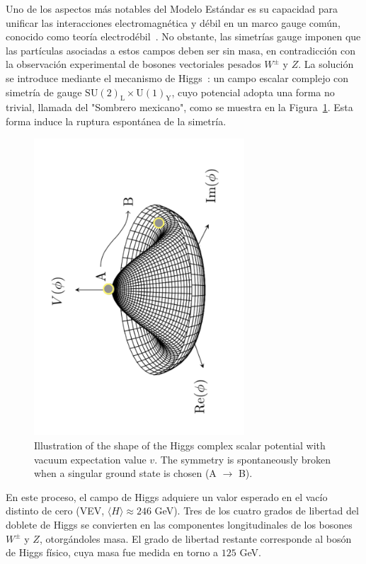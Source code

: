Uno de los aspectos más notables del Modelo Estándar es su capacidad para unificar las interacciones electromagnética y débil en un marco gauge común, conocido como teoría electrodébil~\cite{Glashow,Weinberg,Salam}. No obstante, las simetrías gauge imponen que las partículas asociadas a estos campos deben ser sin masa, en contradicción con la observación experimental de bosones vectoriales pesados \(W^\pm\) y \(Z\). La solución se introduce mediante el mecanismo de Higgs~\cite{Brout,HiggsSpontan}: un campo escalar complejo con simetría de gauge \(\mathrm{SU(2)_{L} \times U(1)_{Y}}\), cuyo potencial adopta una forma no trivial, llamada del "Sombrero mexicano", como se muestra en la Figura~\ref{res:mexican_hat}. Esta forma induce la ruptura espontánea de la simetría.  

\begin{figure}[htbp]
  \centering
  \includegraphics[angle=-90,width=0.7\textwidth]{images/mexican_hat.pdf}
  \caption{Illustration of the shape of the Higgs complex scalar potential with vacuum expectation value $v$. The symmetry is spontaneously broken when a singular ground state is chosen (A $\rightarrow$ B).}
  \label{res:mexican_hat}
\end{figure}

En este proceso, el campo de Higgs adquiere un valor esperado en el vacío distinto de cero (VEV, \(\langle H \rangle \approx 246\) GeV). Tres de los cuatro grados de libertad del doblete de Higgs se convierten en las componentes longitudinales de los bosones \(W^\pm\) y \(Z\), otorgándoles masa. El grado de libertad restante corresponde al bosón de Higgs físico, cuya masa fue medida en torno a \(125\) GeV.  

